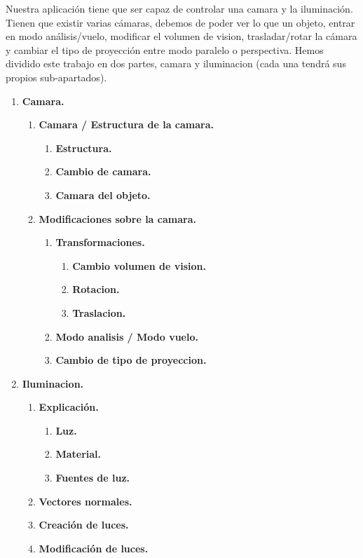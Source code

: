 \documentclass[12pt,a4paper]{article}
\begin{document}
Nuestra aplicación tiene que ser capaz de controlar una camara y la iluminación.
Tienen que existir varias cámaras, debemos de poder ver lo que un objeto, entrar en modo análisis/vuelo, modificar el volumen de vision, trasladar/rotar la cámara y cambiar el tipo de proyección entre modo paralelo o perspectiva.\newline
Hemos dividido este trabajo en dos partes, camara y iluminacion (cada una tendrá sus propios sub-apartados).
\begin{enumerate}
\item \textbf{Camara.}
\begin{enumerate}
\item \textbf{Camara / Estructura de la camara.}
\begin{enumerate}
\item \textbf{Estructura.}
\item \textbf{Cambio de camara.}
\item \textbf{Camara del objeto.}
\end{enumerate}
\item \textbf{Modificaciones sobre la camara.}
\begin{enumerate}
\item \textbf{Transformaciones.}
\begin{enumerate}
\item \textbf{Cambio volumen de vision.}
\item \textbf{Rotacion.}
\item \textbf{Traslacion.}
\end{enumerate}
\item \textbf{Modo analisis / Modo vuelo.}
\item \textbf{Cambio de tipo de proyeccion.}
\end{enumerate}
\end{enumerate}


\item \textbf{Iluminacion.}
\begin{enumerate}
\item \textbf{Explicación.}
\begin{enumerate}
\item \textbf{Luz.}
\item \textbf{Material.}
\item \textbf{Fuentes de luz.}
\end{enumerate}
\item \textbf{Vectores normales.}
\item \textbf{Creación de luces.}
\item \textbf{Modificación de luces.}

\end{enumerate}
\end{enumerate}
\end{document}
